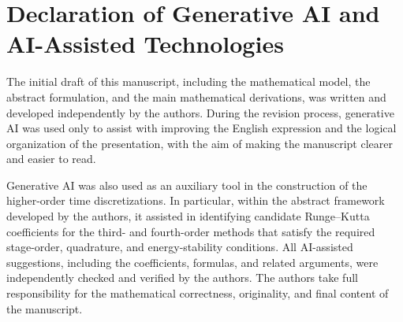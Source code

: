\documentclass[11pt,a4paper]{article}
\theoremstyle{definition}
\numberwithin{equation}{section}
\begin{document}
\section*{Declaration of Generative AI and AI-Assisted Technologies}

The initial draft of this manuscript, including the mathematical model,
the abstract formulation, and the main mathematical derivations, was
written and developed independently by the authors. During the revision
process, generative AI was used only to assist with improving the English
expression and the logical organization of the presentation, with the aim
of making the manuscript clearer and easier to read.

Generative AI was also used as an auxiliary tool in the construction of
the higher-order time discretizations. In particular, within the abstract
framework developed by the authors, it assisted in identifying candidate
Runge--Kutta coefficients for the third- and fourth-order methods that
satisfy the required stage-order, quadrature, and energy-stability
conditions. All AI-assisted suggestions, including the coefficients,
formulas, and related arguments, were independently checked and verified
by the authors. The authors take full responsibility for the mathematical
correctness, originality, and final content of the manuscript.
\end{document}
